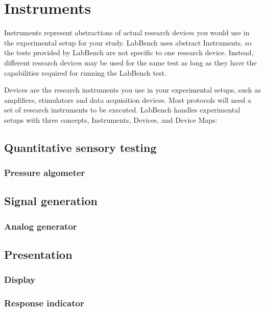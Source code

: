 \chapter{Instruments}
\label{ch:Instruments}

Instruments represent abstractions of actual research devices you would use in the experimental setup for your study. LabBench uses abstract Instruments, so the tests provided by LabBench are not specific to one research device. Instead, different research devices may be used for the same test as long as they have the capabilities required for running the LabBench test.

Devices are the research instruments you use in your experimental setups, such as amplifiers, stimulators and data acquisition devices. Most protocols will need a set of research instruments to be executed. 
LabBench handles experimental setups with three concepts, Instruments, Devices, and Device Maps:

\section{Quantitative sensory testing}

\subsection{Pressure algometer}

\section{Signal generation}

\subsection{Analog generator}

\section{Presentation}

\subsection{Display}

\subsection{Response indicator}

